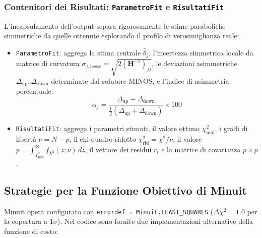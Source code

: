 \documentclass[11pt,a4paper]{article}
\begin{document}
\subsubsection{Contenitori dei Risultati: \texttt{ParametroFit} e \texttt{RisultatiFit}}
L'incapsulamento dell'output separa rigorosamente le stime paraboliche simmetriche da quelle ottenute esplorando il profilo di verosimiglianza reale:
\begin{itemize}
    \item \texttt{ParametroFit}: aggrega la stima centrale $\hat{\theta}_j$, l'incertezza simmetrica locale da matrice di curvatura $\sigma_{j, \text{hesse}} = \sqrt{2 (\mathbf{H}^{-1})_{jj}}$, le deviazioni asimmetriche $\Delta_{\text{up}}, \Delta_{\text{down}}$ determinate dal solutore MINOS, e l'indice di asimmetria percentuale:
    \begin{equation}
        \alpha_j = \frac{\Delta_{\text{up}} - \Delta_{\text{down}}}{\frac{1}{2}(\Delta_{\text{up}} + \Delta_{\text{down}})} \times 100
    \end{equation}
    \item \texttt{RisultatiFit}: aggrega i parametri stimati, il valore ottimo $\chi^2_{\text{min}}$, i gradi di libertà $\nu = N - p$, il chi-quadro ridotto $\chi^2_{\text{rid}} = \chi^2 / \nu$, il valore $p = \int_{\chi^2_{\text{min}}}^\infty f_{\chi^2}(z; \nu)\,dz$, il vettore dei residui $r_i$ e la matrice di covarianza $p \times p$.
\end{itemize}

\subsection{Strategie per la Funzione Obiettivo di Minuit}

Minuit opera configurato con \texttt{errordef = Minuit.LEAST\_SQUARES} ($\Delta \chi^2 = 1.0$ per la copertura a $1\sigma$). Nel codice sono fornite due implementazioni alternative della funzione di costo:
\end{document}
